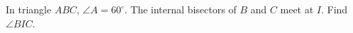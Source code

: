 In triangle $ABC$, $\angle A=60^\circ$. The internal bisectors of $B$ and $C$ meet at $I$. Find $\angle BIC$.
